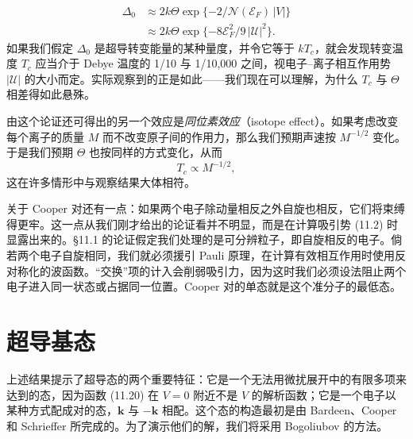 \begin{align*}
\Delta_{0} &\approx 2k\Theta\exp\{-2/\mathcal{N}(\mathcal{E}_{F})\,|V|\}\\
&\approx 2k\Theta\exp\{-8\mathcal{E}_{F}^{2}/9\,|\mathcal{U}|^{2}\}.
\tag{11.22}
\end{align*}
如果我们假定 $\Delta_{0}$ 是超导转变能量的某种量度，并令它等于 $kT_{c}$，就会发现转变温度 $T_{c}$ 应当介于 Debye 温度的 1/10 与 1/10,000 之间，视电子–离子相互作用势 $|\mathcal{U}|$ 的大小而定。实际观察到的正是如此——我们现在可以理解，为什么 $T_{c}$ 与 $\Theta$ 相差得如此悬殊。

由这个论证还可得出的另一个效应是\emph{同位素效应}（isotope effect）。如果考虑改变每个离子的质量 $M$ 而不改变原子间的作用力，那么我们预期声速按 $M^{-1/2}$ 变化。于是我们预期 $\Theta$ 也按同样的方式变化，从而
\begin{equation*}
T_{c}\propto M^{-1/2},
\tag{11.23}
\end{equation*}
这在许多情形中与观察结果大体相符。

关于 Cooper 对还有一点：如果两个电子除动量相反之外自旋也相反，它们将束缚得更牢。这一点从我们刚才给出的论证看并不明显，而是在计算吸引势 (11.2) 时显露出来的。§11.1 的论证假定我们处理的是可分辨粒子，即自旋相反的电子。倘若两个电子自旋相同，我们就必须援引 Pauli 原理，在计算有效相互作用时使用反对称化的波函数。“交换”项的计入会削弱吸引力，因为这时我们必须设法阻止两个电子进入同一状态或占据同一位置。Cooper 对的单态就是这个准分子的最低态。

\section{超导基态}

上述结果提示了超导态的两个重要特征：它是一个无法用微扰展开中的有限多项来达到的态，因为函数 (11.20) 在 $V=0$ 附近不是 $V$ 的解析函数；它是一个电子以某种方式配成对的态，$\mathbf{k}$ 与 $-\mathbf{k}$ 相配。这个态的构造最初是由 Bardeen、Cooper 和 Schrieffer 所完成的。为了演示他们的解，我们将采用 Bogoliubov 的方法。

